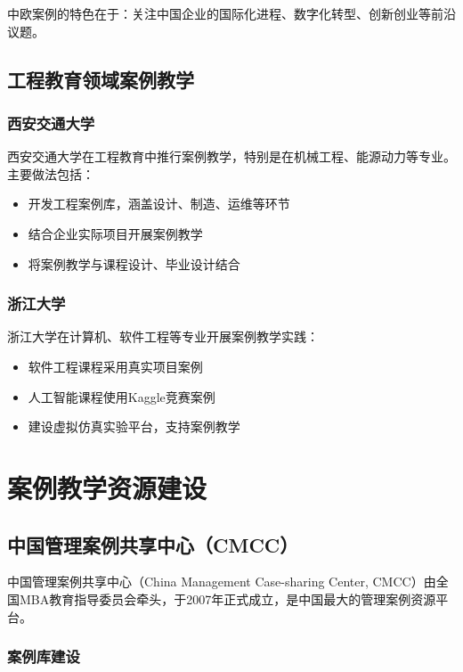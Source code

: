 \documentclass[12pt,a4paper]{ctexart}
\begin{document}
中欧案例的特色在于：关注中国企业的国际化进程、数字化转型、创新创业等前沿议题。

\subsection{工程教育领域案例教学}

\subsubsection{西安交通大学}

西安交通大学在工程教育中推行案例教学，特别是在机械工程、能源动力等专业。主要做法包括：
\begin{itemize}[leftmargin=2em]
    \item 开发工程案例库，涵盖设计、制造、运维等环节
    \item 结合企业实际项目开展案例教学
    \item 将案例教学与课程设计、毕业设计结合
\end{itemize}

\subsubsection{浙江大学}

浙江大学在计算机、软件工程等专业开展案例教学实践：
\begin{itemize}[leftmargin=2em]
    \item 软件工程课程采用真实项目案例
    \item 人工智能课程使用Kaggle竞赛案例
    \item 建设虚拟仿真实验平台，支持案例教学
\end{itemize}

\section{案例教学资源建设}

\subsection{中国管理案例共享中心（CMCC）}

中国管理案例共享中心（China Management Case-sharing Center, CMCC）由全国MBA教育指导委员会牵头，于2007年正式成立，是中国最大的管理案例资源平台。

\subsubsection{案例库建设}
\end{document}
